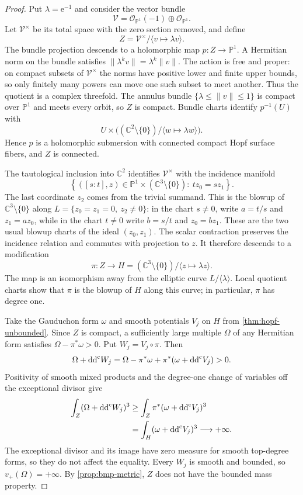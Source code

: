 \begin{proof}
Put $\lambda=\mathrm e^{-1}$ and consider the vector bundle
\[
 \mathcal V=\mathcal O_{\mathbb P^1}(-1)
                  \oplus\mathcal O_{\mathbb P^1}.
\]
Let $\mathcal V^\times$ be its total space with the zero section
removed, and define
\[
 Z=\mathcal V^\times/\langle v\mapsto\lambda v\rangle.
\]
The bundle projection descends to a holomorphic map
$p\colon Z\to\mathbb P^1$.
A Hermitian norm on the bundle satisfies
$\|\lambda^kv\|=\lambda^k\|v\|$. The action is free and proper:
on compact subsets of $\mathcal V^\times$ the norms have positive
lower and finite upper bounds, so only finitely many powers can
move one such subset to meet another. Thus the quotient is a
complex threefold. The annulus bundle
$\{\lambda\leq\|v\|\leq1\}$ is compact over $\mathbb P^1$ and
meets every orbit, so $Z$ is compact. Bundle charts identify
$p^{-1}(U)$ with
\[
 U\times\bigl((\mathbb C^2\setminus\{0\})/
                    \langle w\mapsto\lambda w\rangle\bigr).
\]
Hence $p$ is a holomorphic submersion with connected compact
Hopf surface fibers, and $Z$ is connected.

The tautological inclusion into $\mathbb C^2$ identifies
$\mathcal V^\times$ with the incidence manifold
\[
 \left\{([s:t],z)\in\mathbb P^1\times
      (\mathbb C^3\setminus\{0\}):\ t z_0=s z_1\right\}.
\]
The last coordinate $z_2$ comes from the trivial summand. This
is the blowup of $\mathbb C^3\setminus\{0\}$ along
$L=\{z_0=z_1=0,\ z_2\ne0\}$: in the chart $s\ne0$, write $a=t/s$ and
$z_1=az_0$, while in the chart $t\ne0$ write $b=s/t$ and
$z_0=bz_1$. These are the two usual blowup charts of the ideal
$(z_0,z_1)$. The scalar contraction preserves the incidence
relation and commutes with projection to $z$. It therefore
descends to a modification
\[
 \pi\colon Z\longrightarrow
 H=(\mathbb C^3\setminus\{0\})/
                \langle z\mapsto\lambda z\rangle.
\]
The map is an isomorphism away from the elliptic curve
$L/\langle\lambda\rangle$. Local quotient charts show that $\pi$
is the blowup of $H$ along this curve; in particular, $\pi$ has
degree one.

Take the Gauduchon form $\omega$ and smooth potentials $V_j$ on
$H$ from \cref{thm:hopf-unbounded}. Since $Z$ is compact, a
sufficiently large multiple $\Omega$ of any Hermitian form satisfies
$\Omega-\pi^*\omega>0$. Put $W_j=V_j\circ\pi$. Then
\[
 \Omega+\mathrm{dd}^{\mathrm{c}} W_j
 =\Omega-\pi^*\omega+\pi^*(\omega+\mathrm{dd}^{\mathrm{c}} V_j)>0.
\]
Positivity of smooth mixed products and the degree-one change
of variables off the exceptional divisor give
\[
 \begin{aligned}
 \int_Z(\Omega+\mathrm{dd}^{\mathrm{c}} W_j)^3
 &\geq\int_Z\pi^*(\omega+\mathrm{dd}^{\mathrm{c}} V_j)^3\\
 &=\int_H(\omega+\mathrm{dd}^{\mathrm{c}} V_j)^3\longrightarrow+\infty.
 \end{aligned}
\]
The exceptional divisor and its image have zero measure for
smooth top-degree forms, so they do not affect the equality.
Every $W_j$ is smooth and bounded, so $v_+(\Omega)=+\infty$.
By \cref{prop:bmp-metric}, $Z$ does not have the bounded mass
property.


\end{proof}
